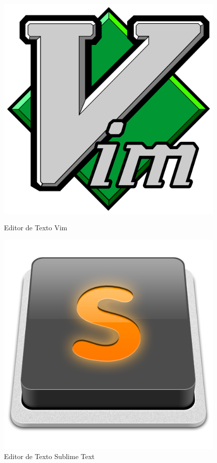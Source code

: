\documentclass[12pt]{article}
\begin{document}
\begin{figure}[!htb]
	\centering
	\begin{minipage}{0.5\textwidth}
		\centering
		\includegraphics[scale=0.1]{logo-vim.png}
		\caption{Editor de Texto Vim}
		\label{Vim logo}
	\end{minipage}%
	\begin{minipage}{0.5\textwidth}
		\centering
		\includegraphics[scale=0.23]{logo-sublime.png}
		\caption{Editor de Texto Sublime Text}
		\label{Sublime Text logo}
	\end{minipage}
\end{figure}
\end{document}
